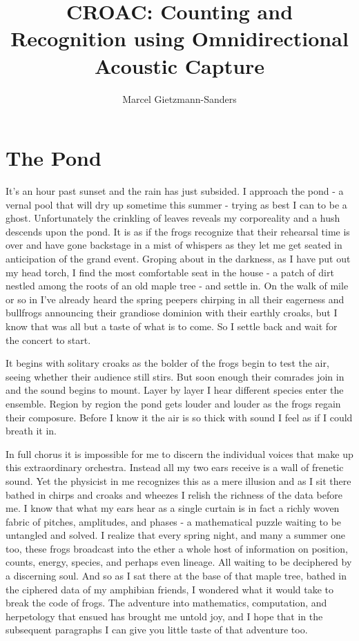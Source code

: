 \documentclass[12pt,a6paper]{book}
\title{CROAC: Counting and Recognition using Omnidirectional Acoustic Capture}
\author{Marcel Gietzmann-Sanders}
\begin{document}
\maketitle
\tableofcontents
\newpage
\chapter{The Pond}
It's an hour past sunset and the rain has just subsided. I approach the pond - a vernal pool that will dry up sometime this summer - trying as best I can to be a ghost. Unfortunately the crinkling of leaves reveals my corporeality and a hush descends upon the pond. It is as if the frogs recognize that their rehearsal time is over and have gone backstage in a mist of whispers as they let me get seated in anticipation of the grand event. Groping about in the darkness, as I have put out my head torch, I find the most comfortable seat in the house - a patch of dirt nestled among the roots of an old maple tree - and settle in. On the walk of mile or so in I've already heard the spring peepers chirping in all their eagerness and bullfrogs announcing their grandiose dominion with their earthly croaks, but I know that was all but a taste of what is to come. So I settle back  and wait for the concert to start.

It begins with solitary croaks as the bolder of the frogs begin to test the air, seeing whether their audience still stirs. But soon enough their comrades join in and the sound begins to mount. Layer by layer I hear different species enter the ensemble. Region by region the pond gets louder and louder as the frogs regain their composure. Before I know it the air is so thick with sound I feel as if I could breath it in. 

In full chorus it is impossible for me to discern the individual voices that make up this extraordinary orchestra. Instead all my two ears receive is a wall of frenetic sound. Yet the physicist in me recognizes this as a mere illusion and as I sit there bathed in chirps and croaks and wheezes I relish the richness of the data before me. I know that what my ears hear as a single curtain is in fact a richly woven fabric of pitches, amplitudes, and phases - a mathematical puzzle waiting to be untangled and solved. I realize that every spring night, and many a summer one too, these frogs broadcast into the ether a whole host of information on position, counts, energy, species, and perhaps even lineage. All waiting to be deciphered by a discerning soul. And so as I sat there at the base of that maple tree, bathed in the ciphered data of my amphibian friends, I wondered what it would take to break the code of frogs. The adventure into mathematics, computation, and herpetology that ensued has brought me untold joy, and I hope that in the subsequent paragraphs I can give you little taste of that adventure too. 
\newpage
\end{document}
